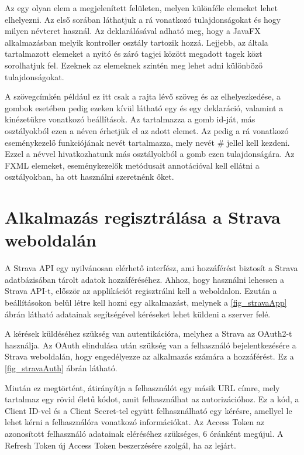Az  egy olyan elem a megjelenített felületen, melyen különféle elemeket lehet elhelyezni.
Az első sorában láthatjuk a rá vonatkozó tulajdonságokat és hogy milyen névteret használ.
Az  deklarálásával adható meg, hogy a JavaFX alkalmazásban melyik kontroller osztály tartozik hozzá.
Lejjebb, az általa tartalmazott elemeket a nyitó és záró tagjei között megadott  tagek közt sorolhatjuk fel.
Ezeknek az elemeknek szintén meg lehet adni különböző tulajdonságokat.

A szövegcímkén például ez itt csak a rajta lévő szöveg és az elhelyezkedése, a gombok esetében pedig ezeken kívül látható egy  és egy  deklaráció, valamint a kinézetükre vonatkozó beállítások.
Az  tartalmazza a gomb id-ját, más osztályokból ezen a néven érhetjük el az adott elemet.
Az  pedig a rá vonatkozó eseménykezelő funkciójának nevét tartalmazza, mely nevét \# jellel kell kezdeni.
Ezzel a névvel hivatkozhatunk más osztályokból a gomb ezen tulajdonságára.
Az FXML elemeket, eseménykezelők metódusait  annotációval kell ellátni a  osztályokban, ha ott használni szeretnénk őket.  



\section{Alkalmazás regisztrálása a Strava weboldalán}

A Strava API egy nyilvánosan elérhető interfész, ami hozzáférést biztosít a Strava adatbázisában tárolt adatok hozzáféréséhez.
Ahhoz, hogy használni lehessen a Strava API-t, először az applikációt regisztrálni kell a weboldalon.
Ezután a beállításokon belül létre kell hozni egy alkalmazást, melynek a \ref{fig_stravaApp} ábrán látható adatainak segítségével kéréseket lehet küldeni a szerver felé. 


A kérések küldéséhez szükség van autentikációra, melyhez a Strava az OAuth2-t használja.
Az OAuth elindulása után szükség van a felhasználó bejelentkezésére a Strava weboldalán, hogy engedélyezze az alkalmazás számára a hozzáférést.
Ez a \ref{fig_stravaAuth} ábrán látható. 


Miután ez megtörtént, átirányítja a felhasználót egy másik URL címre, mely tartalmaz egy rövid életű kódot, amit felhasználhat az autorizációhoz.
Ez a kód, a Client ID-vel és a Client Secret-tel együtt felhasználható egy kérésre, amellyel le lehet kérni a felhasználóra vonatkozó információkat.
Az Access Token az azonosított felhasználó adatainak eléréséhez szükséges, 6 óránként megújul.
A Refresh Token új Access Token beszerzésére szolgál, ha az lejárt.

